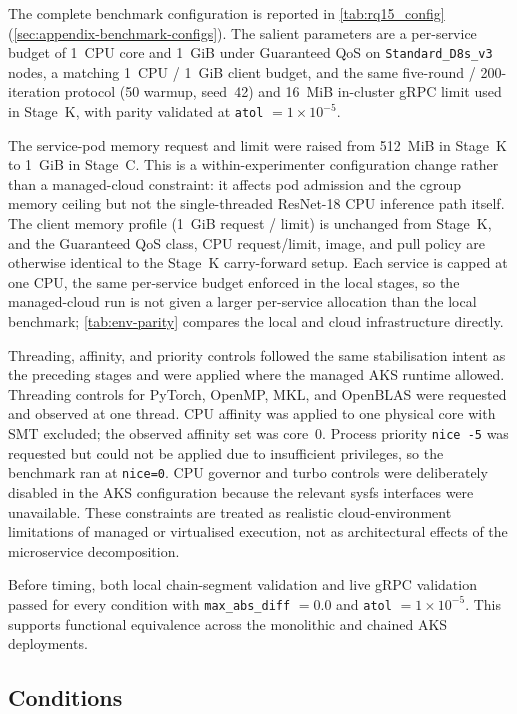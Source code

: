 The complete benchmark configuration is reported in
\cref{tab:rq15_config} (\cref{sec:appendix-benchmark-configs}). The salient
parameters are a per-service budget of 1~CPU core and 1~GiB under Guaranteed QoS
on \texttt{Standard\_D8s\_v3} nodes, a matching 1~CPU / 1~GiB client budget, and
the same five-round / 200-iteration protocol (50 warmup, seed~42) and 16~MiB
in-cluster gRPC limit used in Stage~K, with parity validated at
\texttt{atol} $= 1 \times 10^{-5}$.

The service-pod memory request and limit were raised from 512~MiB in Stage~K to
1~GiB in Stage~C. This is a within-experimenter configuration change rather than
a managed-cloud constraint: it affects pod admission and the cgroup memory
ceiling but not the single-threaded ResNet-18 CPU inference path itself. The
client memory profile (1~GiB request / limit) is unchanged from Stage~K, and the
Guaranteed QoS class, CPU request/limit, image, and pull policy are otherwise
identical to the Stage~K carry-forward setup. Each service is capped at one CPU,
the same per-service budget enforced in the local stages, so the managed-cloud
run is not given a larger per-service allocation than the local benchmark;
\cref{tab:env-parity} compares the local and cloud infrastructure directly.

Threading, affinity, and priority controls followed the same stabilisation intent as
the preceding stages and were applied where the managed AKS runtime allowed.
Threading controls for PyTorch, OpenMP, MKL, and OpenBLAS were requested and observed
at one thread. CPU affinity was applied to one physical core with SMT excluded; the
observed affinity set was core~0. Process priority \texttt{nice~-5} was requested but
could not be applied due to insufficient privileges, so the benchmark ran at
\texttt{nice=0}. CPU governor and turbo controls were deliberately disabled in the AKS
configuration because the relevant sysfs interfaces were unavailable. These constraints
are treated as realistic cloud-environment limitations of managed or virtualised
execution, not as architectural effects of the microservice decomposition.

Before timing, both local chain-segment validation and live gRPC validation passed for
every condition with \texttt{max\_abs\_diff} $= 0.0$ and
\texttt{atol} $= 1 \times 10^{-5}$. This supports functional equivalence across the
monolithic and chained AKS deployments.

\subsection{Conditions}

